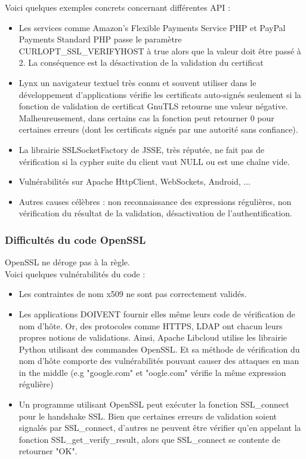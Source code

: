 			Voici quelques exemples concrets concernant différentes API : 
			\begin{itemize}
			\item Les services comme Amazon's Flexible Payments Service PHP et PayPal Payments Standard PHP passe le paramètre CURLOPT\_SSL\_VERIFYHOST à true alors que la valeur doit être passé à 2. La conséquence est la désactivation de la validation du certificat
			\item Lynx un navigateur textuel très connu et souvent utiliser dans le développement d'applications vérifie les certificats auto-signés seulement si la fonction de validation de certificat GnuTLS retourne une valeur négative. Malheureusement, dans certains cas la fonction peut retourner 0 pour certaines erreurs (dont les certificats signés par une autorité sans confiance).
			\item La librairie SSLSocketFactory de JSSE, très réputée, ne fait pas de vérification si la cypher suite du client vaut NULL ou est une chaîne vide.
			\item Vulnérabilités sur Apache HttpClient, WebSockets, Android, ...
			\item Autres causes célèbres : non reconnaissance des expressions régulières, non vérification du résultat de la validation, désactivation de l'authentification.\\
			\end{itemize}
			
					
		\subsubsection{Difficultés du code OpenSSL}
			

			OpenSSL ne déroge pas à la règle.\\
			Voici quelques vulnérabilités du code :
			\begin{itemize}
			\item Les contraintes de nom x509 ne sont pas correctement validés.
			\item Les applications DOIVENT fournir elles même leurs code de vérification de nom d'hôte. Or, des protocoles comme HTTPS, LDAP ont chacun leurs propres notions de validations. Ainsi, Apache Libcloud utilise les librairie Python utilisant des commandes OpenSSL. Et sa méthode de vérification du nom d'hôte comporte des vulnérabilités pouvant causer des attaques en man in the middle (e.g "google.com" et "oogle.com" vérifie la même expression régulière)
			\item Un programme utilisant OpenSSL peut exécuter la fonction SSL\_connect pour le handshake SSL. Bien que certaines erreurs de validation soient signalés par SSL\_connect, d'autres ne peuvent être vérifier qu'en appelant la fonction SSL\_get\_verify\_result, alors que SSL\_connect se contente de retourner "OK".
			\end{itemize}

